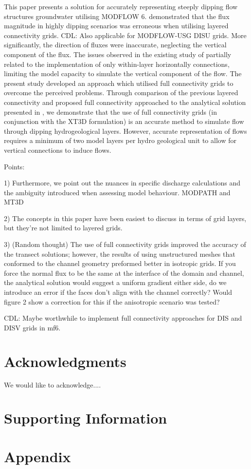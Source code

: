 \documentclass{article}
\begin{document}
This paper presents a solution for accurately representing steeply dipping flow structures groundwater utilising MODFLOW 6. \citep{bardot2022} demonstrated that the flux magnitude in highly dipping scenarios was erroneous when utilising layered connectivity grids.  {\color{red} CDL: Also applicable for MODFLOW-USG DISU grids.} More significantly, the direction of fluxes were inaccurate, neglecting the vertical component of the flux. The issues observed in the existing study of \citep{bardot2022} partially related to the implementation of only within-layer horizontally connections, limiting the model capacity to simulate the vertical component of the flow. The present study developed an approach which utilised full connectivity grids \cite{modflow6gwf} to overcome the perceived problems. Through comparison of the previous layered connectivity and proposed full connectivity approached to the analytical solution presented in \citep{bardot2022}, we demonstrate that the use of full connectivity grids (in conjunction with the XT3D formulation) is an accurate method to simulate flow through dipping hydrogeological layers. However, accurate representation of flows requires a minimum of two model layers per hydro geological unit to allow for vertical connections to induce flows. 

Points:

1) Furthermore, we point out the nuances in specific discharge calculations and the ambiguity introduced when assessing model behaviour.  MODPATH and MT3D

2) The concepts in this paper have been easiest to discuss in terms of grid layers, but they're not limited to layered grids.

3) (Random thought) The use of full connectivity grids improved the accuracy of the transect solutions; however, the results of \citep{bardot2022} using unstructured meshes that conformed to the channel geometry preformed better in isotropic grids. If you force the normal flux to be the same at the interface of the domain and channel, the analytical solution would suggest a uniform gradient either side, do we introduce an error if the faces don't align with the channel correctly?  Would figure 2 show a correction for this if the anisotropic scenario was tested?

 {\color{red} CDL: Maybe worthwhile to implement full connectivity approaches for DIS and DISV grids in mf6.}

\section{Acknowledgments}
We would like to acknowledge....

\section{Supporting Information}

\section{Appendix}


\end{document}
